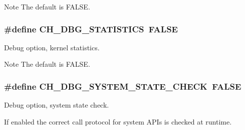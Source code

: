 \begin{DoxyNote}{Note}
The default is {\ttfamily F\+A\+L\+S\+E}. 
\end{DoxyNote}
\hypertarget{group__config_ga01fa48cf866c26bad886a15c37571f99}{
\subsubsection[{C\+H\+\_\+\+D\+B\+G\+\_\+\+S\+T\+A\+T\+I\+S\+T\+I\+C\+S}]{\setlength{\rightskip}{0pt plus 5cm}\#define C\+H\+\_\+\+D\+B\+G\+\_\+\+S\+T\+A\+T\+I\+S\+T\+I\+C\+S~F\+A\+L\+S\+E}}\label{group__config_ga01fa48cf866c26bad886a15c37571f99}


Debug option, kernel statistics. 

\begin{DoxyNote}{Note}
The default is {\ttfamily F\+A\+L\+S\+E}. 
\end{DoxyNote}
\hypertarget{group__config_ga10db71bc25605169dddc82c1604b0a16}{
\subsubsection[{C\+H\+\_\+\+D\+B\+G\+\_\+\+S\+Y\+S\+T\+E\+M\+\_\+\+S\+T\+A\+T\+E\+\_\+\+C\+H\+E\+C\+K}]{\setlength{\rightskip}{0pt plus 5cm}\#define C\+H\+\_\+\+D\+B\+G\+\_\+\+S\+Y\+S\+T\+E\+M\+\_\+\+S\+T\+A\+T\+E\+\_\+\+C\+H\+E\+C\+K~F\+A\+L\+S\+E}}\label{group__config_ga10db71bc25605169dddc82c1604b0a16}


Debug option, system state check. 

If enabled the correct call protocol for system A\+P\+Is is checked at runtime.

